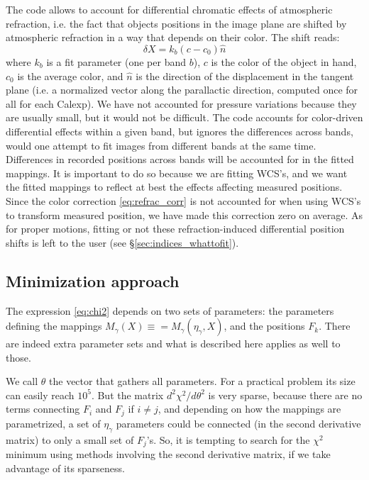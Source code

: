 \documentclass[a4paper,12pt]{scrartcl}
\begin{document}
The code allows to account for differential chromatic effects of 
atmospheric refraction, i.e. the fact that objects positions in the image
plane are shifted by atmospheric refraction in a way that depends on 
their color. The shift reads:
\begin{equation}
\delta X = k_b(c-c_0)\hat{n} \label{eq:refrac_corr}
\end{equation}
where $k_b$ is a fit parameter (one per band $b$), $c$ is the color of
the object in hand, $c_0$ is the average color, and $\hat{n}$ is the
direction of the displacement in the tangent plane (i.e. a normalized
vector along the parallactic direction, computed once for all for each
Calexp).  We have not accounted for pressure variations because they
are usually small, but it would not be difficult. The code accounts
for color-driven differential effects within a given band, but ignores
the differences across bands, would one attempt to fit images from
different bands at the same time. Differences in recorded positions
across bands will be accounted for in the fitted mappings. It is
important to do so because we are fitting WCS's, and we want the fitted
mappings to reflect at best the effects affecting measured
positions. Since the color correction \ref{eq:refrac_corr} is not
accounted for when using WCS's to transform measured position, we have
made this correction zero on average. As for proper motions, fitting
or not these refraction-induced differential position shifts is left
to the user (see \S \ref{sec:indices_whattofit}).

\subsection{Minimization approach}
The expression \ref{eq:chi2} depends on two sets of parameters: the parameters
defining the mappings $M_\gamma(X) \equiv = M_\gamma(\eta_\gamma,X)$,
and the positions $F_k$. There are indeed extra parameter sets and what 
is described here applies as well to those.

We call $\theta$ the vector that gathers
all parameters. For a practical problem its size
can easily reach $10^5$. But the matrix 
$d^2 \chi^2/d \theta^2$ is very sparse, because
there are no terms connecting $F_i$ and $F_j$ if $i \neq j$, and
depending on how the mappings are parametrized, a set of $\eta_\gamma$
parameters could be connected (in the second derivative matrix) 
to only a small set of $F_j$'s. So, it is tempting to search for the 
$\chi^2$ minimum using methods involving the second derivative matrix, 
if we take advantage of its sparseness.
\end{document}
